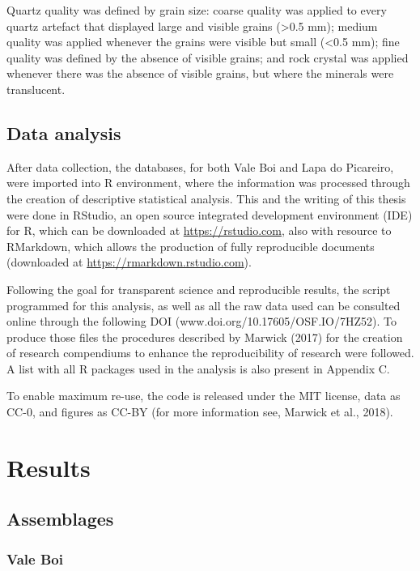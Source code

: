 \documentclass[12pt,twoside]{reedthesis}
\begin{document}
Quartz quality was defined by grain size: coarse quality was applied to every quartz artefact that displayed large and visible grains (\textgreater0.5 mm); medium quality was applied whenever the grains were visible but small (\textless0.5 mm); fine quality was defined by the absence of visible grains; and rock crystal was applied whenever there was the absence of visible grains, but where the minerals were translucent.

\hypertarget{data-analysis}{%
\section{Data analysis}\label{data-analysis}}

After data collection, the databases, for both Vale Boi and Lapa do Picareiro, were imported into R environment, where the information was processed through the creation of descriptive statistical analysis. This and the writing of this thesis were done in RStudio, an open source integrated development environment (IDE) for R, which can be downloaded at \url{https://rstudio.com}, also with resource to RMarkdown, which allows the production of fully reproducible documents (downloaded at \url{https://rmarkdown.rstudio.com}).

Following the goal for transparent science and reproducible results, the script programmed for this analysis, as well as all the raw data used can be consulted online through the following DOI (www.doi.org/10.17605/OSF.IO/7HZ52). To produce those files the procedures described by Marwick (2017) for the creation of research compendiums to enhance the reproducibility of research were followed. A list with all R packages used in the analysis is also present in Appendix C.

To enable maximum re-use, the code is released under the MIT license, data as CC-0, and figures as CC-BY (for more information see, Marwick et al., 2018).

\hypertarget{results}{%
\chapter{Results}\label{results}}

\hypertarget{assemblages}{%
\section{Assemblages}\label{assemblages}}

\hypertarget{vale-boi-2}{%
\subsection{Vale Boi}\label{vale-boi-2}}
\end{document}
